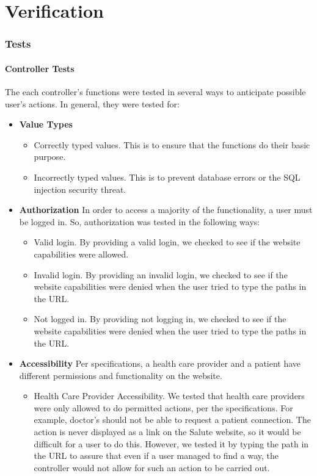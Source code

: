 \documentclass[10pt]{report}
\begin{document}
\part{Verification}
\section{Tests}

\subsection{Controller Tests}
\label{subsec:controllertests}

The each controller's functions were tested in several ways to anticipate possible user's actions. In general, they were tested for:
\begin{itemize}
\item \textbf{Value Types}
\begin{itemize}
\item Correctly typed values. This is to ensure that the functions do their basic purpose.
\item Incorrectly typed values. This is to prevent database errors or the SQL injection security threat.
\end{itemize}
\item \textbf{Authorization} In order to access a majority of the functionality, a user must be logged in. So, authorization was tested in the following ways: 
\begin{itemize}
\item  Valid login. By providing a valid login, we checked to see if the website capabilities were allowed. 
\item Invalid login. By providing an invalid login, we checked to see if the website capabilities were denied when the user tried to type the paths in the URL.
\item Not logged in. By providing not logging in, we checked to see if the website capabilities were denied when the user tried to type the paths in the URL.
\end{itemize}
\item\textbf{Accessibility} Per specifications, a health care provider and a patient have different permissions and functionality on the website. 
\begin{itemize}
\item Health Care Provider Accessibility. We tested that health care providers were only allowed to do permitted actions, per the specifications. For example, doctor's should not be able to request a patient connection. The action is never displayed as a link on the Salute website, so it would be difficult for a user to do this. However, we tested it by typing the path in the URL to assure that even if a user managed to find a way, the controller would not allow for such an action to be carried out. 

\end{itemize}
\end{itemize}
\end{document}
